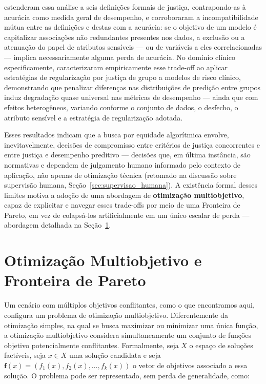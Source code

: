 \citet{berk2021fairness} estenderam essa análise a seis definições formais de justiça, contrapondo-as à acurácia como medida geral de desempenho, e corroboraram a incompatibilidade mútua entre as definições e destas com a acurácia: se o objetivo de um modelo é capitalizar associações não redundantes presentes nos dados, a exclusão ou a atenuação do papel de atributos sensíveis — ou de variáveis a eles correlacionadas — implica necessariamente alguma perda de acurácia. No domínio clínico especificamente, \citet{pfohl2021empirical} caracterizaram empiricamente esse trade-off ao aplicar estratégias de regularização por justiça de grupo a modelos de risco clínico, demonstrando que penalizar diferenças nas distribuições de predição entre grupos induz degradação quase universal nas métricas de desempenho — ainda que com efeitos heterogêneos, variando conforme o conjunto de dados, o desfecho, o atributo sensível e a estratégia de regularização adotada.

Esses resultados indicam que a busca por equidade algorítmica envolve, inevitavelmente, decisões de compromisso entre critérios de justiça concorrentes e entre justiça e desempenho preditivo — decisões que, em última instância, são normativas e dependem de julgamento humano informado pelo contexto de aplicação, não apenas de otimização técnica \cite{berk2021fairness} (retomado na discussão sobre supervisão humana, Seção~\ref{sec:supervisao_humana}). A existência formal desses limites motiva a adoção de uma abordagem de \textbf{otimização multiobjetivo}, capaz de explicitar e navegar esses trade-offs por meio de uma Fronteira de Pareto, em vez de colapsá-los artificialmente em um único escalar de perda — abordagem detalhada na Seção~\ref{sec:moop_pareto}.

\section{Otimização Multiobjetivo e Fronteira de Pareto}
\label{sec:moop_pareto}

Um cenário com múltiplos objetivos conflitantes, como o que encontramos aqui, configura um problema de otimização multiobjetivo. Diferentemente da otimização simples, na qual se busca maximizar ou minimizar uma única função, a otimização multiobjetivo considera simultaneamente um conjunto de funções objetivo potencialmente conflitantes. Formalmente, seja $X$ o espaço de soluções factíveis, seja $x \in X$ uma solução candidata e seja
$\mathbf{f}(x) = (f_1(x), f_2(x), \ldots, f_k(x))$ o vetor de objetivos
associado a essa solução. O problema pode ser representado, sem perda
de generalidade, como:

